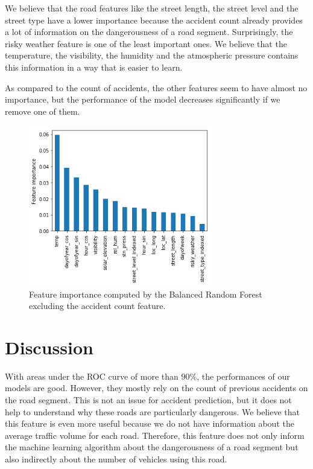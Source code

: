 \documentclass[conference]{IEEEtran}
\begin{document}
We believe that the road features like the street length, the street level and the street type have a lower importance because the accident count already provides a lot of information on the dangerousness of a road segment. Surprisingly, the risky weather feature is one of the least important ones. We believe that the temperature, the visibility, the humidity and the atmospheric pressure contains this information in a way that is easier to learn. 

As compared to the count of accidents, the other features seem to have almost no
importance, but the performance of the model decreases significantly if we
remove one of them. 

\begin{figure}[htbp]
\centerline{\includegraphics[height=7cm, keepaspectratio]{figures/brf_fi_nocount.png}}
\caption{Feature importance computed by the Balanced Random Forest excluding the accident count feature.}
\label{feature importances}
\end{figure}

\section{Discussion}

With areas under the ROC curve of more than $90\%$, the performances of our models are good.
However, they mostly rely on the count of previous accidents on the road segment. 
This is not an issue for accident prediction, but it does not help to 
understand why these roads are particularly dangerous. We believe that
this feature is even more useful because we do not have information
about the average traffic volume for each road. Therefore, this feature does
not only inform the machine learning algorithm about the dangerousness of a road
segment but also indirectly about the number of vehicles using this road.
\end{document}
